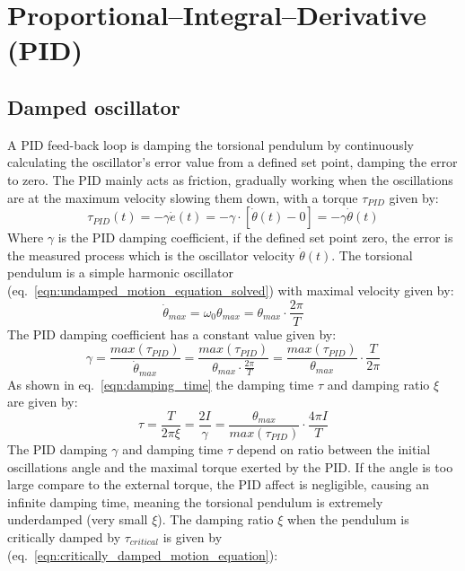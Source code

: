 \documentclass[\main/master.tex]{subfiles}
\begin{document}
\section{Proportional–Integral–Derivative (PID)}

\subsection{Damped oscillator}
A PID feed-back loop is damping the torsional pendulum by continuously calculating the oscillator's error value from a defined set point, damping the error to zero. The PID mainly acts as friction, gradually working when the oscillations are at the maximum velocity slowing them down, with a torque $\tau_{PID}$ given by:
\begin{equation}
\tau_{PID}(t) = -\gamma\dot{e}(t) =  -\gamma\cdot [\dot{\theta}(t)-0]  =  -\gamma\dot{\theta}(t)  \label{eqn:friction_torque_pid}
\end{equation}
Where $\gamma$ is the PID damping coefficient, if the defined set point zero, the error is the measured process which is the oscillator velocity $\dot{\theta}(t)$. The torsional pendulum is a simple harmonic oscillator (eq.~\ref{eqn:undamped_motion_equation_solved}) with maximal velocity given by:
\begin{equation}
\dot{\theta}_{max} = \omega_0\theta_{max} = \theta_{max}\cdot\frac{2\pi}{T}    \label{eqn:undamped_motion_equation_3}
\end{equation}
 The PID damping coefficient has a constant value given by:
\begin{equation}
\gamma  =  \frac{max(\tau_{PID})}{\dot{\theta}_{max}} =  \frac{max(\tau_{PID})}{\theta_{max}\cdot\frac{2\pi}{T}} =\frac{max(\tau_{PID})}{\theta_{max}}\cdot \frac{ T}{2\pi}          \label{eqn:damped_pid_motion_equation_2}
\end{equation}
As shown in eq.~\ref{eqn:damping_time} the damping time $\tau$ and damping ratio $\xi$ are given by:
\begin{equation}
\tau = \frac{T}{2 \pi \xi } =  \frac{2I}{\gamma} = \frac{\theta_{max}}{ max(\tau_{PID})} \cdot \frac{4\pi I}{T}  \label{eqn:damping_time_pid}
\end{equation}
The PID damping $\gamma$ and damping time $\tau$ depend on ratio between the initial oscillations angle and the maximal torque exerted by the PID. If the angle is too large compare to the external torque, the PID affect is negligible, causing an infinite damping time, meaning the torsional pendulum is extremely underdamped (very small $\xi$). The damping ratio $\xi$ when the pendulum is critically damped by $\tau_{critical}$ is given by (eq.~\ref{eqn:critically_damped_motion_equation}):
\end{document}
